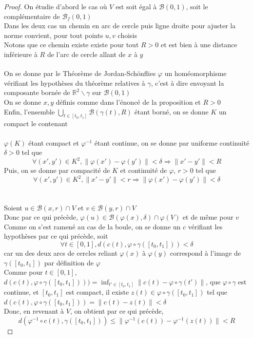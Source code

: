 \documentclass{article}
\begin{document}
\begin{flushleft}
\begin{proof}
    On étudie d'abord le cas où $V$ est soit égal à $\mathcal{B}(0, 1)$, soit le complémentaire de $\mathcal{B}_f(0, 1)$\\
    Dans les deux cas un chemin en arc de cercle puis ligne droite pour ajuster la norme convient, pour tout points $u, v$ choisis\\
    Notons que ce chemin existe existe pour tout $R > 0$ et est bien à une distance inférieure à $R$ de l'arc de cercle allant
    de $x$ à $y$
    \\~\\
    On se donne par le Théorème de Jordan-Schönflies $\varphi$ un homéomorphisme vérifiant les hypothèses du théorème relatives
    à $\gamma$, c'est à dire envoyant la composante bornée de $\mathbb{R}^2 \backslash \gamma$ sur $\mathcal{B}(0, 1)$\\
    On se donne $x, y$ définis comme dans l'énoncé de la proposition et $R > 0$\\
    Enfin, l'ensemble $\bigcup_{t \in [t_0, t_1]} \mathcal{B}(\gamma(t), R)$
    étant borné, on se donne $K$ un compact le contenant
    \\~\\
    $\varphi(K)$ étant compact et $\varphi^{-1}$ étant continue, on se donne par uniforme continuité $\delta > 0$ tel que
    \[ \forall (x', y') \in K^2, \| \varphi(x') - \varphi(y') \| < \delta \Longrightarrow \| x' - y' \| < R \]
    Puis, on se donne par compacité de $K$ et continuité de $\varphi$, $r > 0$ tel que
    \[ \forall (x', y') \in K^2, \| x' - y'\| < r \Longrightarrow \| \varphi(x') - \varphi(y') \| < \delta \]
    \\~\\
    Soient $u \in \mathcal{B}(x, r) \cap V$ et $v \in \mathcal{B}(y, r) \cap V$\\
    Donc par ce qui précède, $\varphi(u) \in \mathcal{B}(\varphi(x), \delta) \cap \varphi(V)$ et de même pour $v$\\
    Comme on s'est ramené au cas de la boule, on se donne un $c$ vérifiant les hypothèses par ce qui précède, soit
    \[ \forall t \in [0, 1], d(c(t), \varphi \circ \gamma([t_0, t_1])) < \delta \]
    car un des deux arcs de cercles reliant $\varphi(x)$ à $\varphi(y)$ correspond à l'image de $\gamma([t_0, t_1])$ par
    définition de $\varphi$\\
    Comme pour $t \in [0, 1]$, $d(c(t), \varphi \circ \gamma([t_0, t_1]))) = \inf_{t' \in [t_0, t_1]} \| c(t) - \varphi \circ \gamma(t') \|$,
    que $\varphi \circ \gamma$ est continue, et $[t_0, t_1]$ est compact, il existe $z(t) \in \varphi \circ \gamma([t_0, t_1])$ tel que
    $d(c(t), \varphi \circ \gamma([t_0, t_1])) = \| c(t) - z(t) \| < \delta$\\
    Donc, en revenant à $V$, on obtient par ce qui précède,
    \[ d(\varphi^{-1} \circ c(t), \gamma([t_0, t_1])) \leq \| \varphi^{-1}(c(t)) - \varphi^{-1}(z(t)) \| < R \]
\end{proof}


\end{flushleft}
\end{document}
